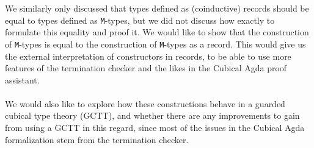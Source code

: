 \documentclass[twoside,11pt,openright]{report}
\theoremstyle{plain} %
\theoremstyle{definition}
\theoremstyle{remark}
\begin{document}
We similarly only discussed that types defined as (coinductive) records should be equal to types defined as \texttt{M}-types, but we did not discuss how exactly to formulate this equality and proof it. We would like to show that the construction of \texttt{M}-types is equal to the construction of \texttt{M}-types as a record. This would give us the external interpretation of constructors in records, to be able to use more features of the termination checker and the likes in the Cubical Agda proof assistant.
\\ \\
We would also like to explore how these constructions behave in a guarded cubical type theory (GCTT), and whether there are any improvements to gain from using a GCTT in this regard, since most of the issues in the Cubical Agda formalization stem from the termination checker.



\cleardoublepage
{}
 


\end{document}
